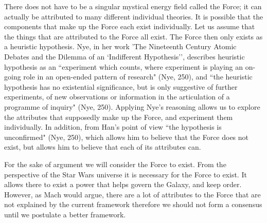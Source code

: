 \documentclass[11pt, oneside]{article}
\begin{document}
\par There does not have to be a singular mystical energy field called the Force; it can actually be attributed to many different individual theories. It is possible that the components that make up the Force each exist individually. Let us assume that the things that are attributed to the Force all exist. The Force then only exists as a heuristic hypothesis. Nye, in her work 'The Nineteenth Century Atomic Debates and the Dilemma of an `Indifferent Hypothesis'', describes heuristic hypothesis as an ``experiment which counts, where experiment is playing an on-going role in an open-ended pattern of research" (Nye, 250), and ``the heuristic hypothesis has no existential significance, but is only suggestive of further experiments, of new observations or information in the articulation of a programme of inquiry" (Nye, 250).   Applying Nye's reasoning allows us to explore the attributes that supposedly make up the Force, and experiment them individually. In addition, from Han's point of view ``the hypothesis is unconfirmed" (Nye, 250), which allows him to believe that the Force does not exist, but allows him to believe that each of its attributes can.

\par For the sake of argument we will consider the Force to exist. From the perspective of the Star Wars universe it is necessary for the Force to exist. It allows there to exist a power that helps govern the Galaxy, and keep order. However, as Mach would argue, there are a lot of attributes to the Force that are not explained by the current framework therefore we should not form a consensus until we postulate a better framework.
\end{document}
